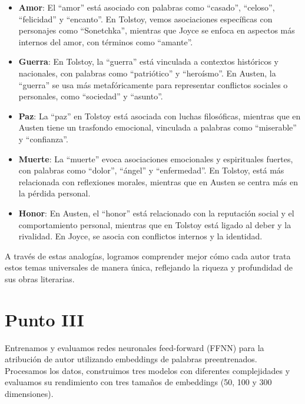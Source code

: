 \documentclass[11pt,english]{article}
\theoremstyle{plain}
\begin{document}
\begin{itemize}
    \item \textbf{Amor}: El ``amor'' está asociado con palabras como ``casado'', ``celoso'', ``felicidad'' y ``encanto''. En Tolstoy, vemos asociaciones específicas con personajes como ``Sonetchka'', mientras que Joyce se enfoca en aspectos más internos del amor, con términos como ``amante''.
    
    \item \textbf{Guerra}: En Tolstoy, la ``guerra'' está vinculada a contextos históricos y nacionales, con palabras como ``patriótico'' y ``heroísmo''. En Austen, la ``guerra'' se usa más metafóricamente para representar conflictos sociales o personales, como ``sociedad'' y ``asunto''.
    
    \item \textbf{Paz}: La ``paz'' en Tolstoy está asociada con luchas filosóficas, mientras que en Austen tiene un trasfondo emocional, vinculada a palabras como ``miserable'' y ``confianza''.
    
    \item \textbf{Muerte}: La ``muerte'' evoca asociaciones emocionales y espirituales fuertes, con palabras como ``dolor'', ``ángel'' y ``enfermedad''. En Tolstoy, está más relacionada con reflexiones morales, mientras que en Austen se centra más en la pérdida personal.
    
    \item \textbf{Honor}: En Austen, el ``honor'' está relacionado con la reputación social y el comportamiento personal, mientras que en Tolstoy está ligado al deber y la rivalidad. En Joyce, se asocia con conflictos internos y la identidad.
\end{itemize}

A través de estas analogías, logramos comprender mejor cómo cada autor trata estos temas universales de manera única, reflejando la riqueza y profundidad de sus obras literarias.

\section*{Punto III}

Entrenamos y evaluamos redes neuronales feed-forward (FFNN) para la atribución de autor utilizando embeddings de palabras preentrenados. Procesamos los datos, construimos tres modelos con diferentes complejidades y evaluamos su rendimiento con tres tamaños de embeddings (50, 100 y 300 dimensiones).
\end{document}
